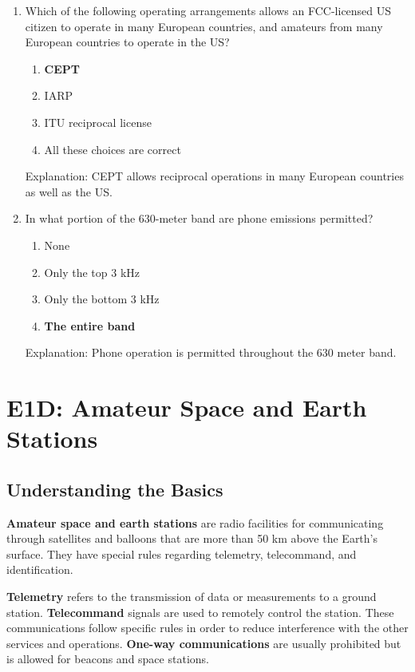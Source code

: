 \begin{enumerate}
     \item Which of the following operating arrangements allows an FCC-licensed US citizen to operate in many European countries, and amateurs from many European countries to operate in the US?
      \begin{enumerate}
      \item \textbf {CEPT}
        \item  IARP
      \item  ITU reciprocal license
     \item  All these choices are correct
      \end{enumerate}
      \textcolor{myred}{Explanation:}
       CEPT allows reciprocal operations in many European countries as well as the US.

        \item In what portion of the 630-meter band are phone emissions permitted?
         \begin{enumerate}
          \item None
          \item  Only the top 3 kHz
           \item  Only the bottom 3 kHz
       \item \textbf {The entire band}
       \end{enumerate}
        \textcolor{myred}{Explanation:}
     Phone operation is permitted throughout the 630 meter band.
\end{enumerate}


\section{E1D: Amateur Space and Earth Stations}
\subsection*{Understanding the Basics}
   \textcolor{myblue}{\textbf{Amateur space and earth stations}} are radio facilities for communicating through satellites and balloons that are more than 50 km above the Earth's surface. They have special rules regarding telemetry, telecommand, and identification.
\par
   \textcolor{myblue}{\textbf{Telemetry}} refers to the transmission of data or measurements to a ground station.
   \textcolor{myblue}{\textbf{Telecommand}} signals are used to remotely control the station. These communications follow specific rules in order to reduce interference with the other services and operations.
   \textcolor{myblue}{\textbf{One-way communications}} are usually prohibited but is allowed for beacons and space stations.

